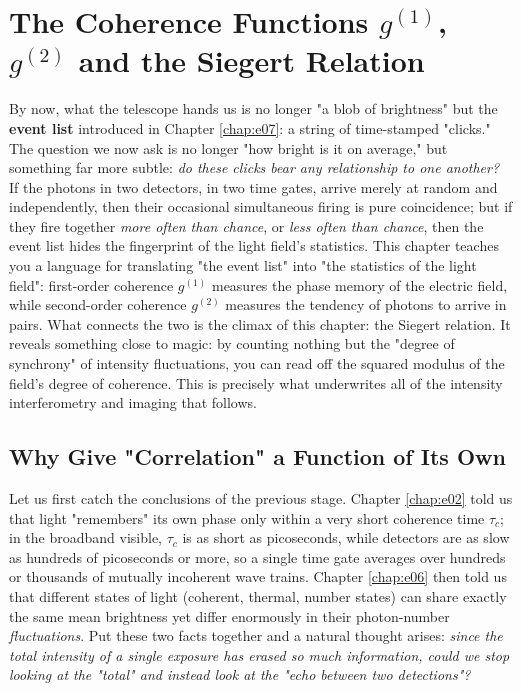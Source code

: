 \chapter{\texorpdfstring{The Coherence Functions $g^{(1)}$, $g^{(2)}$ and the Siegert Relation}{The Coherence Functions g1, g2 and the Siegert Relation}}
\label{chap:e08}

\begin{chapteropening}
By now, what the telescope hands us is no longer "a blob of brightness" but the \textbf{event list} introduced in Chapter \ref{chap:e07}: a string of time-stamped "clicks." The question we now ask is no longer "how bright is it on average," but something far more subtle: \emph{do these clicks bear any relationship to one another?} If the photons in two detectors, in two time gates, arrive merely at random and independently, then their occasional simultaneous firing is pure coincidence; but if they fire together \emph{more often than chance}, or \emph{less often than chance}, then the event list hides the fingerprint of the light field's statistics. This chapter teaches you a language for translating "the event list" into "the statistics of the light field": first-order coherence \(g^{(1)}\) measures the phase memory of the electric field, while second-order coherence \(g^{(2)}\) measures the tendency of photons to arrive in pairs. What connects the two is the climax of this chapter: the Siegert relation. It reveals something close to magic: by counting nothing but the "degree of synchrony" of intensity fluctuations, you can read off the squared modulus of the field's degree of coherence. This is precisely what underwrites all of the intensity interferometry and imaging that follows.
\end{chapteropening}

\section{Why Give "Correlation" a Function of Its Own}
\label{sec:e08-why-correlation}

Let us first catch the conclusions of the previous stage. Chapter \ref{chap:e02} told us that light "remembers" its own phase only within a very short coherence time \(\tau_c\); in the broadband visible, \(\tau_c\) is as short as picoseconds, while detectors are as slow as hundreds of picoseconds or more, so a single time gate averages over hundreds or thousands of mutually incoherent wave trains. Chapter \ref{chap:e06} then told us that different states of light (coherent, thermal, number states) can share exactly the same mean brightness yet differ enormously in their photon-number \emph{fluctuations}. Put these two facts together and a natural thought arises: \emph{since the total intensity of a single exposure has erased so much information, could we stop looking at the "total" and instead look at the "echo between two detections"?}

